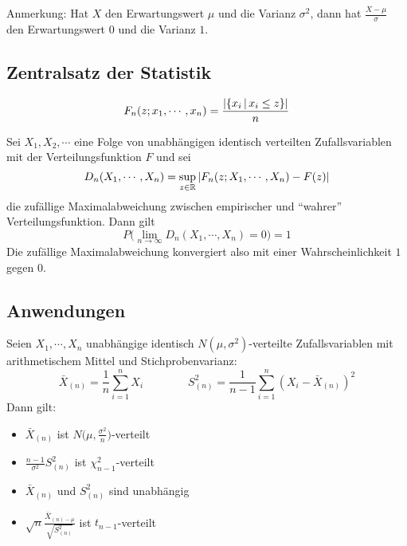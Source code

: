             Anmerkung: Hat \(X\) den Erwartungswert \(\mu\) und die Varianz \(\sigma^2\), dann hat \( \frac{X - \mu}{\sigma} \) den Erwartungswert \(0\) und die Varianz \(1\).

        \subsection{Zentralsatz der Statistik}
            \begin{equation*}
	            F_n(z; x_1, \cdots, x_n) = \frac{\abs{\{ x_i \,\vert\, x_i \leq z \}}}{n}
            \end{equation*}
        
            Sei \( X_1, X_2, \cdots \) eine Folge von unabhängigen identisch verteilten Zufallsvariablen mit der Verteilungsfunktion \(F\) und sei
            \begin{equation*}
                D_n(X_1, \cdots, X_n) = \sup_{z \in \mathbb{R}} \abs{F_n(z; X_1, \cdots, X_n) - F(z)}
            \end{equation*}
            die zufällige Maximalabweichung zwischen empirischer und \enquote{wahrer} Verteilungsfunktion. Dann gilt
            \begin{equation*}
                P\bigg( \lim\limits_{n \rightarrow \infty} D_n(X_1, \cdots, X_n) = 0 \bigg) = 1
            \end{equation*}
            Die zufällige Maximalabweichung konvergiert also mit einer Wahrscheinlichkeit \(1\) gegen \(0\).

        \subsection{Anwendungen}
            Seien \( X_1, \cdots, X_n \) unabhängige identisch \( N(\mu, \sigma^2) \)-verteilte Zufallsvariablen mit arithmetischem Mittel und Stichprobenvarianz:
            \begin{equation*}
                \bar{X}_{(n)} = \frac{1}{n} \sum_{i = 1}^{n} X_i \qquad\qquad S_{(n)}^2 = \frac{1}{n - 1} \sum_{i = 1}^{n} (X_i - \bar{X}_{(n)})^2
            \end{equation*}
            Dann gilt:
            \begin{itemize}
            	\item \( \bar{X}_{(n)} \) ist \( N\Big(\mu, \frac{\sigma^2}{n}\Big) \)-verteilt
            	\item \( \frac{n - 1}{\sigma^2} S_{(n)}^2 \) ist \( \chi_{n - 1}^2 \)-verteilt
            	\item \( \bar{X}_{(n)} \) und \( S_{(n)}^2 \) sind unabhängig
            	\item \( \sqrt{n} \frac{\bar{X}_{(n) - \mu}}{\sqrt{S_{(n)}^2}} \) ist \( t_{n-1} \)-verteilt
            \end{itemize}

